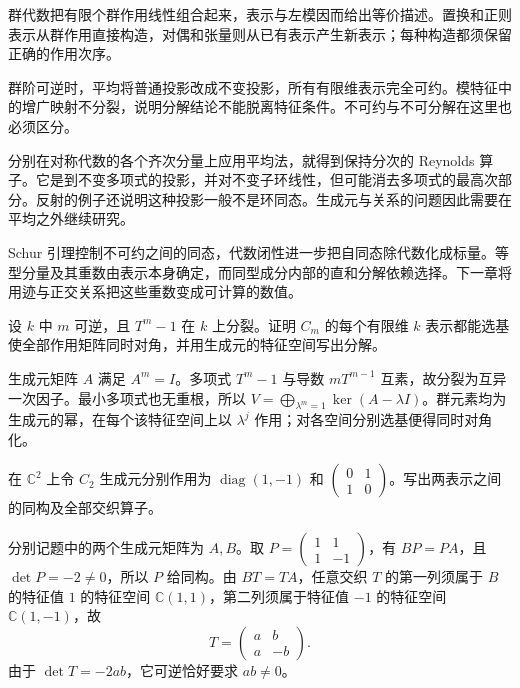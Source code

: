 




\begin{chaptersummary}
	群代数把有限个群作用线性组合起来，表示与左模因而给出等价描述。置换和正则表示从群作用直接构造，对偶和张量则从已有表示产生新表示；每种构造都须保留正确的作用次序。

	\ProseParagraphBreak
	群阶可逆时，平均将普通投影改成不变投影，所有有限维表示完全可约。模特征中的增广映射不分裂，说明分解结论不能脱离特征条件。不可约与不可分解在这里也必须区分。

	\ProseParagraphBreak
	分别在对称代数的各个齐次分量上应用平均法，就得到保持分次的 Reynolds 算子。它是到不变多项式的投影，并对不变子环线性，但可能消去多项式的最高次部分。反射的例子还说明这种投影一般不是环同态。生成元与关系的问题因此需要在平均之外继续研究。

	\ProseParagraphBreak
	Schur 引理控制不可约之间的同态，代数闭性进一步把自同态除代数化成标量。等型分量及其重数由表示本身确定，而同型成分内部的直和分解依赖选择。下一章将用迹与正交关系把这些重数变成可计算的数值。
\end{chaptersummary}

\BookExercises

\begin{exercise}\label{b5:ex:01-cyclic-diagonalization}
	设 \(k\) 中 \(m\) 可逆，且 \(T^m-1\) 在 \(k\) 上分裂。证明 \(C_m\) 的每个有限维 \(k\) 表示都能选基使全部作用矩阵同时对角，并用生成元的特征空间写出分解。
\end{exercise}
\begin{solution}
	生成元矩阵 \(A\) 满足 \(A^m=I\)。多项式 \(T^m-1\) 与导数 \(mT^{m-1}\) 互素，故分裂为互异一次因子。最小多项式也无重根，所以 \(V=\bigoplus_{\lambda^m=1}\ker(A-\lambda I)\)。群元素均为生成元的幂，在每个该特征空间上以 \(\lambda^j\) 作用；对各空间分别选基便得同时对角化。
\end{solution}

\begin{exercise}\label{b5:ex:01-change-basis}
	在 \(\mathbb C^2\) 上令 \(C_2\) 生成元分别作用为 \(\operatorname{diag}(1,-1)\) 和 \(\begin{pmatrix}0&1\\1&0\end{pmatrix}\)。写出两表示之间的同构及全部交织算子。
\end{exercise}
\begin{solution}
	分别记题中的两个生成元矩阵为 \(A,B\)。取 \(P=\begin{pmatrix}1&1\\1&-1\end{pmatrix}\)，有 \(BP=PA\)，且 \(\det P=-2\ne0\)，所以 \(P\) 给同构。由 \(BT=TA\)，任意交织 \(T\) 的第一列须属于 \(B\) 的特征值 \(1\) 的特征空间 \(\mathbb C(1,1)\)，第二列须属于特征值 \(-1\) 的特征空间 \(\mathbb C(1,-1)\)，故
	\[
		T=\begin{pmatrix}a&b\\a&-b\end{pmatrix}.
	\]
	由于 \(\det T=-2ab\)，它可逆恰好要求 \(ab\ne0\)。
\end{solution}

